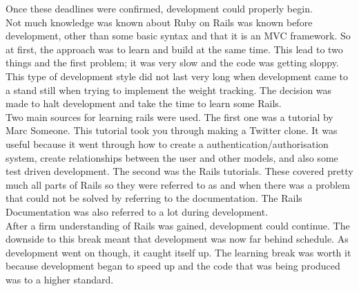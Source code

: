 \noindent
Once these deadlines were confirmed, development could properly begin.\\

Not much knowledge was known about Ruby on Rails was known before development, other than some basic syntax and that it is an MVC framework. So at first, the approach was to learn and build at the same time. This lead to two things and the first problem; it was very slow and the code was getting sloppy. This type of development style did not last very long when development came to a stand still when trying to implement the weight tracking. The decision was made to halt development and take the time to learn some Rails.\\

Two main sources for learning rails were used. The first one was a tutorial by Marc Someone. This tutorial took you through making a Twitter \citep{twitter:2006} clone. It was useful because it went through how to create a authentication/authorisation system, create relationships between the user and other models, and also some test driven development. The second was the Rails tutorials. These covered pretty much all parts of Rails so they were referred to as and when there was a problem that could not be solved by referring to the documentation. The Rails Documentation was also referred to a lot during development.\\

After a firm understanding of Rails was gained, development could continue. The downside to this break meant that development was now far behind schedule. As development went on though, it caught itself up. The learning break was worth it because development began to speed up and the code that was being produced was to a higher standard.\\

